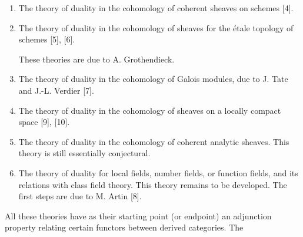 \begin{enumerate}
\renewcommand{\labelenumi}{\arabic{enumi})}
\item The theory of duality in the cohomology of coherent sheaves on schemes
[4].

\item The theory of duality in the cohomology of sheaves for the étale
topology of schemes [5], [6].

These theories are due to A. Grothendieck.

\item The theory of duality in the cohomology of Galois modules, due to
J. Tate and J.-L. Verdier [7].

\item The theory of duality in the cohomology of sheaves on a locally compact
space [9], [10].

\item The theory of duality in the cohomology of coherent analytic sheaves.
This theory is still essentially conjectural.

\item The theory of duality for local fields, number fields, or function
fields, and its relations with class field theory. This theory remains to be
developed. The first steps are due to M. Artin [8].
\end{enumerate}

All these theories have as their starting point (or endpoint) an adjunction
property relating certain functors between derived categories. The

